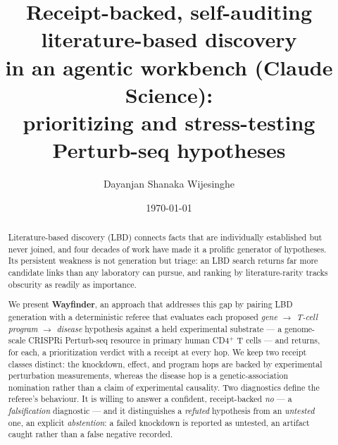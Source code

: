 \documentclass[11pt]{article}
\title{\vspace{-2em}\bfseries\color{sectioncolor}Receipt-backed, self-auditing literature-based discovery\\
  in an agentic workbench (Claude Science):\\
  prioritizing and stress-testing Perturb-seq hypotheses}
\author{Dayanjan Shanaka Wijesinghe}
\date{\today}
\begin{document}
\maketitle

\begin{abstract}
Literature-based discovery (LBD) connects facts that are individually established but never joined, and
four decades of work have made it a prolific generator of hypotheses. Its persistent weakness is not
generation but triage: an LBD search returns far more candidate links than any laboratory can pursue, and
ranking by literature-rarity tracks obscurity as readily as importance.

\vspace{2pt}
We present \textbf{Wayfinder}, an approach that addresses this gap by pairing LBD generation with a
deterministic referee that evaluates each proposed \emph{gene $\rightarrow$ T-cell program $\rightarrow$
disease} hypothesis against a held experimental substrate --- a genome-scale CRISPRi Perturb-seq resource in
primary human CD4$^{+}$ T cells --- and returns, for each, a prioritization verdict with a receipt at every
hop. We keep two receipt classes distinct: the knockdown, effect, and program hops are backed by
experimental perturbation measurements, whereas the disease hop is a genetic-association nomination rather
than a claim of experimental causality. Two diagnostics define the referee's behaviour. It is willing to
answer a confident, receipt-backed \emph{no} --- a \emph{falsification} diagnostic --- and it distinguishes a
\emph{refuted} hypothesis from an \emph{untested} one, an explicit \emph{abstention}: a failed knockdown is
reported as untested, an artifact caught rather than a false negative recorded.


\end{abstract}
\end{document}
